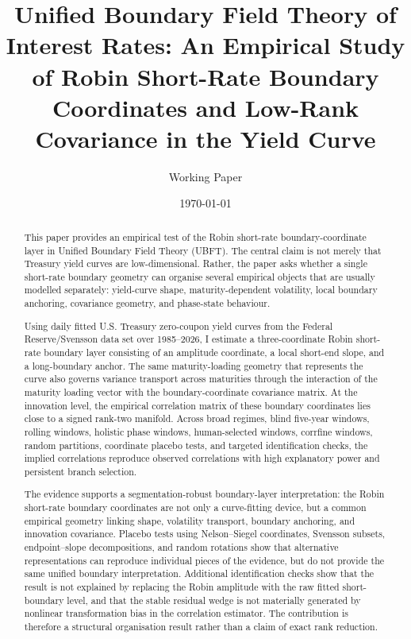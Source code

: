 \documentclass[11pt]{article}
\title{Unified Boundary Field Theory of Interest Rates: An Empirical Study of Robin Short-Rate Boundary Coordinates and Low-Rank Covariance in the Yield Curve}
\author{Working Paper}
\date{\today}
\begin{document}
\maketitle

\begin{abstract}
This paper provides an empirical test of the Robin short-rate boundary-coordinate layer in Unified Boundary Field Theory (UBFT). The central claim is not merely that Treasury yield curves are low-dimensional. Rather, the paper asks whether a single short-rate boundary geometry can organise several empirical objects that are usually modelled separately: yield-curve shape, maturity-dependent volatility, local boundary anchoring, covariance geometry, and phase-state behaviour.

Using daily fitted U.S. Treasury zero-coupon yield curves from the Federal Reserve/Svensson data set over 1985--2026, I estimate a three-coordinate Robin short-rate boundary layer consisting of an amplitude coordinate, a local short-end slope, and a long-boundary anchor. The same maturity-loading geometry that represents the curve also governs variance transport across maturities through the interaction of the maturity loading vector with the boundary-coordinate covariance matrix. At the innovation level, the empirical correlation matrix of these boundary coordinates lies close to a signed rank-two manifold. Across broad regimes, blind five-year windows, rolling windows, holistic phase windows, human-selected windows, corrfine windows, random partitions, coordinate placebo tests, and targeted identification checks, the implied correlations reproduce observed correlations with high explanatory power and persistent branch selection.

The evidence supports a segmentation-robust boundary-layer interpretation: the Robin short-rate boundary coordinates are not only a curve-fitting device, but a common empirical geometry linking shape, volatility transport, boundary anchoring, and innovation covariance. Placebo tests using Nelson--Siegel coordinates, Svensson subsets, endpoint--slope decompositions, and random rotations show that alternative representations can reproduce individual pieces of the evidence, but do not provide the same unified boundary interpretation. Additional identification checks show that the result is not explained by replacing the Robin amplitude with the raw fitted short-boundary level, and that the stable residual wedge is not materially generated by nonlinear transformation bias in the correlation estimator. The contribution is therefore a structural organisation result rather than a claim of exact rank reduction.
\end{abstract}
\end{document}
